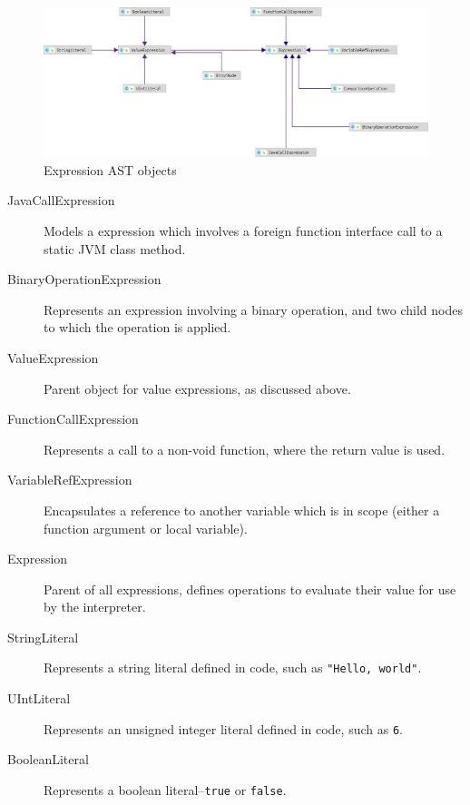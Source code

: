 \documentclass[a4paper,openany,12pt]{book}
\begin{document}
\begin{figure}[H]
    \begin{MyMdframed}
        \vspace{0.5em}

        \caption{\label{figure:ast:expressions}Expression AST objects}
        \vspace{0.5em}
        \captionsetup{style=default}

        \centering \includegraphics[width=0.9\linewidth]{expressions.eps}
    \end{MyMdframed}
\end{figure}

\begin{description}
    \item[JavaCallExpression] Models a expression which involves a foreign function interface call to a static JVM class method.
    \item[BinaryOperationExpression] Represents an expression involving a binary operation, and two child nodes to which the operation is applied.
    \item[ValueExpression] Parent object for value expressions, as discussed above.
    \item[FunctionCallExpression] Represents a call to a non-void function, where the return value is used.
    \item[VariableRefExpression] Encapsulates a reference to another variable which is in scope (either a function argument or local variable).
    \item[Expression] Parent of all expressions, defines operations to evaluate their value for use by the interpreter.
    \item[StringLiteral] Represents a string literal defined in code, such as  \texttt{"Hello, world"}.
    \item[UIntLiteral] Represents an unsigned integer literal defined in code, such as  \texttt{6}.
    \item[BooleanLiteral] Represents a boolean literal--\texttt{true} or \texttt{false}.
\end{description}
\end{document}
